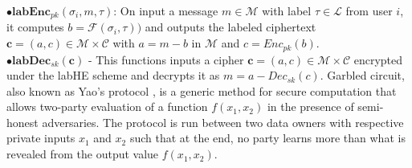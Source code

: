 $\bullet \textbf{labEnc}_{pk}(\sigma_i, m , \tau)$: On input a message $m \in \mathcal{M} $ with label $\tau \in \mathcal{L}$  from user $i$, it computes $b=\mathcal{F}(\sigma_i, \tau))$ and outputs the labeled ciphertext $\mathbf{c}=(a,c) \in \mathcal{M} \times \mathcal{C}$ with $ a= m- b$ in $\mathcal{M}$ and $c=Enc_{pk}(b)$.\\
$\bullet \textbf{labDec}_{sk}(\mathbf{c})$ - This functions inputs a cipher $\mathbf{c}=(a,c) \in \mathcal{M} \times \mathcal{C}$ encrypted under the labHE scheme and decrypts it as $m=a-Dec_{sk}(c)$.
Garbled circuit, also known as Yao's protocol \cite{Yao,yao2},  is a generic method for secure  computation that allows two-party evaluation of a function $f(x_1,x_2)$ in the presence of semi-honest adversaries. The protocol is run between two data owners with respective private inputs $x_1$ and $x_2$ such that at the end, no party learns more  
than what is revealed from the output value $f(x_1,x_2)$.  

